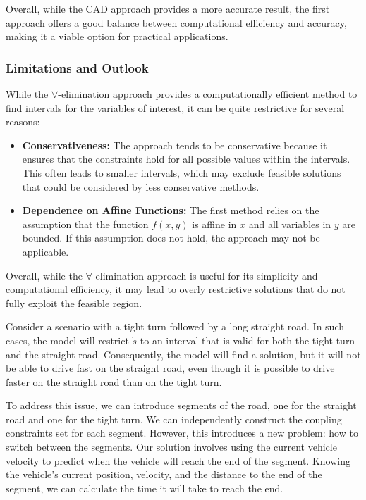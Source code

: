 Overall, while the CAD approach provides a more accurate result, the first approach offers a good balance between computational efficiency and
accuracy, making it a viable option for practical applications.

\subsubsection{Limitations and Outlook}\label{subsubsec:limitations_and_outlook}

While the $\forall$-elimination approach provides a computationally efficient method to find intervals for the variables of interest, it can be quite restrictive for several reasons:

\begin{itemize}
	\item \textbf{Conservativeness:}
	      The approach tends to be conservative because it ensures that the constraints hold for all possible values within the intervals.
	      This often leads to smaller intervals, which may exclude feasible solutions that could be considered by less conservative methods.
	\item \textbf{Dependence on Affine Functions:}
	      The first method relies on the assumption that the function $f(x, y)$ is affine in $x$ and all variables in $y$ are bounded.
	      If this assumption does not hold, the approach may not be applicable.
\end{itemize}

Overall, while the $\forall$-elimination approach is useful for its simplicity and computational efficiency, it may lead to overly restrictive
solutions that do not fully exploit the feasible region.

Consider a scenario with a tight turn followed by a long straight road.
In such cases, the model will restrict $\dot{s}$ to an interval that is valid for both the tight turn and the straight road.
Consequently, the model will find a solution, but it will not be able to drive fast on the straight road, even though it is possible to drive faster
on the straight road than on the tight turn.

To address this issue, we can introduce segments of the road, one for the straight road and one for the tight turn.
We can independently construct the coupling constraints set for each segment.
However, this introduces a new problem: how to switch between the segments.
Our solution involves using the current vehicle velocity to predict when the vehicle will reach the end of the segment.
Knowing the vehicle's current position, velocity, and the distance to the end of the segment, we can calculate the time it will take to reach the
end.

